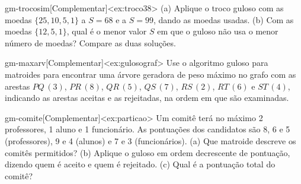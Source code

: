 \begin{exercicio}{gm-trocosim}[Complementar]<ex:troco38>
(a) Aplique o troco guloso com as moedas $\{25,10,5,1\}$ a $S=68$ e a $S=99$, dando as moedas usadas. (b) Com as moedas $\{12,5,1\}$, qual é o menor valor $S$ em que o guloso não usa o menor número de moedas? Compare as duas soluções.
\end{exercicio}
\begin{exercicio}{gm-maxarv}[Complementar]<ex:gulosograf>
Use o algoritmo guloso para matroides para encontrar uma árvore geradora de peso máximo no grafo com as arestas $PQ\,(3)$, $PR\,(8)$, $QR\,(5)$, $QS\,(7)$, $RS\,(2)$, $RT\,(6)$ e $ST\,(4)$, indicando as arestas aceitas e as rejeitadas, na ordem em que são examinadas.
\end{exercicio}
\begin{exercicio}{gm-comite}[Complementar]<ex:particao>
Um comitê terá no máximo 2 professores, 1 aluno e 1 funcionário. As pontuações dos candidatos são 8, 6 e 5 (professores), 9 e 4 (alunos) e 7 e 3 (funcionários). (a) Que matroide descreve os comitês permitidos? (b) Aplique o guloso em ordem decrescente de pontuação, dizendo quem é aceito e quem é rejeitado. (c) Qual é a pontuação total do comitê?
\end{exercicio}
